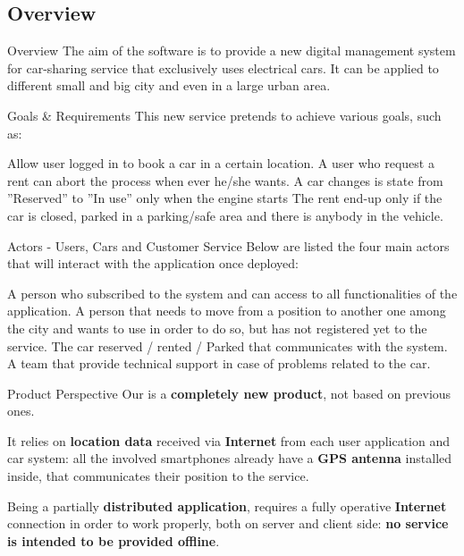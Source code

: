 \documentclass{../Common/Structure/pdf_presentation}
\begin{document}
	\subsection{Overview}
	\begin{frame}{Overview}
		The aim of the software is to provide a new digital management system for car-sharing service that exclusively uses
		electrical cars. It can be applied to different small and big city and even in a large urban area.
	\end{frame}
	\begin{frame}{Goals & Requirements}
		This new service pretends to achieve various goals, such as:
		\begin{itemize}
			 Allow user logged in to book a car in a certain location.
			 A user who request a rent can abort the process when ever he/she wants.
			 A car changes is state from ”Reserved” to ”In use” only when the engine starts
			 The rent end-up only if the car is closed, parked in a parking/safe area and there is anybody in the vehicle.
		\end{itemize}
	\end{frame}
	\begin{frame}{Actors - Users, Cars and Customer Service}
		Below are listed the four main actors that will interact with the application once deployed:
		\begin{itemize}
			 A person who subscribed to the system and can access to all functionalities of the application.
			 A person that needs to move from a position	to another one among the city and wants to use \PowerEnJoy{} in order to do so, but has not registered yet to the service.
			 The car reserved / rented / Parked that communicates with the system.
			 A team that provide technical support in case of problems related to the car.
		\end{itemize}
	\end{frame}
	\begin{frame}{Product Perspective}
		Our \PowerEnJoy{} is a \textbf{completely new product}, not based on previous ones.\par
		It relies on \textbf{location data} received via \textbf{Internet} from each user application and car system: all the involved smartphones already have a \textbf{GPS antenna} installed inside, that communicates their position to the service.\par
		Being a partially \textbf{distributed application}, \PowerEnJoy{} requires a fully operative \textbf{Internet} connection in order to work properly, both on server and client side: \textbf{no service is intended to be provided offline}.
	\end{frame}
\end{document}
